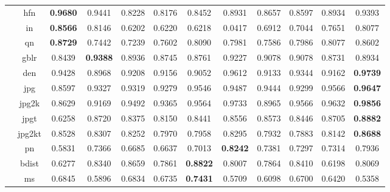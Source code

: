 \documentclass[11pt,a4paper]{article}
\begin{document}
\begin{table}[!htb]
\begin{scriptsize}
\begin{threeparttable}
\begin{tabular}{*{12}{c}}
& hfn & \cellcolor{red!25}\textbf{0.9680} & 0.9441 & \cellcolor{green!25}0.8228 & \cellcolor{green!25}0.8176 & \cellcolor{green!25}0.8452 & \cellcolor{green!25}0.8931 & \cellcolor{green!25}0.8657 & \cellcolor{green!25}0.8597 & \cellcolor{green!25}0.8934 & 0.9393\\
& in & \textbf{0.8566} & 0.8146 & \cellcolor{green!25}0.6202 & \cellcolor{green!25}0.6220 & \cellcolor{green!25}0.6218 & \cellcolor{green!25}0.0417 & 0.6912 & 0.7044 & 0.7651 & 0.8077\\
& qn & \textbf{0.8729} & \cellcolor{green!25}0.7442 & \cellcolor{green!25}0.7239 & \cellcolor{green!25}0.7602 & 0.8090 & 0.7981 & \cellcolor{green!25}0.7586 & 0.7986 & 0.8077 & 0.8602\\
& gblr & 0.8439 & \cellcolor{red!25}\textbf{0.9388} & 0.8936 & 0.8745 & 0.8761 & 0.9227 & 0.9078 & 0.9078 & 0.8731 & 0.8934\\
& den & \cellcolor{green!25}0.9428 & \cellcolor{green!25}0.8968 & \cellcolor{green!25}0.9208 & \cellcolor{green!25}0.9156 & \cellcolor{green!25}0.9052 & 0.9612 & \cellcolor{green!25}0.9133 & \cellcolor{green!25}0.9344 & \cellcolor{green!25}0.9162 & \textbf{0.9739}\\
& jpg & \cellcolor{green!25}0.8597 & \cellcolor{green!25}0.9327 & \cellcolor{green!25}0.9319 & \cellcolor{green!25}0.9279 & 0.9546 & 0.9487 & 0.9444 & \cellcolor{green!25}0.9299 & 0.9566 & \textbf{0.9647}\\
& jpg2k & \cellcolor{green!25}0.8629 & \cellcolor{green!25}0.9169 & \cellcolor{green!25}0.9492 & \cellcolor{green!25}0.9365 & \cellcolor{green!25}0.9564 & \cellcolor{green!25}0.9733 & \cellcolor{green!25}0.8965 & \cellcolor{green!25}0.9566 & \cellcolor{green!25}0.9632 & \textbf{0.9856}\\
& jpgt & \cellcolor{green!25}0.6258 & 0.8720 & 0.8375 & 0.8150 & 0.8441 & 0.8556 & 0.8573 & 0.8446 & 0.8705 & \textbf{0.8882}\\
& jpg2kt & 0.8528 & 0.8307 & 0.8252 & 0.7970 & 0.7958 & 0.8295 & 0.7932 & 0.7883 & 0.8142 & \textbf{0.8688}\\
& pn & \cellcolor{green!25}0.5831 & 0.7366 & 0.6685 & \cellcolor{green!25}0.6637 & 0.7013 & \textbf{0.8242} & 0.7381 & 0.7297 & 0.7314 & 0.7936\\
& bdist & \cellcolor{green!25}0.6277 & 0.8340 & 0.8659 & 0.7861 & \textbf{0.8822} & 0.8007 & 0.7864 & 0.8410 & \cellcolor{green!25}0.6198 & 0.8069\\
& ms & 0.6845 & 0.5896 & 0.6834 & 0.6735 & \cellcolor{red!25}\textbf{0.7431} & 0.5709 & 0.6098 & 0.6700 & 0.6420 & 0.5358\\

\end{tabular}
\end{threeparttable}
\end{scriptsize}
\end{table}
\end{document}
